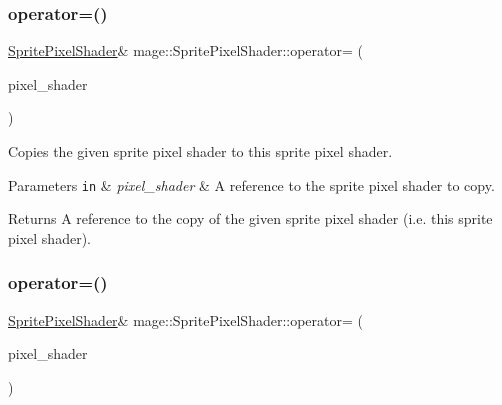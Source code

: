 \subsubsection{\texorpdfstring{operator=()}{operator=()}\hspace{0.1cm}{\footnotesize\ttfamily [1/2]}}
{\footnotesize\ttfamily \hyperlink{classmage_1_1_sprite_pixel_shader}{Sprite\+Pixel\+Shader}\& mage\+::\+Sprite\+Pixel\+Shader\+::operator= (\begin{DoxyParamCaption}\item[{const \hyperlink{classmage_1_1_sprite_pixel_shader}{Sprite\+Pixel\+Shader} \&}]{pixel\+\_\+shader }\end{DoxyParamCaption})\hspace{0.3cm}{\ttfamily [delete]}}

Copies the given sprite pixel shader to this sprite pixel shader.


\begin{DoxyParams}[1]{Parameters}
\mbox{\tt in}  & {\em pixel\+\_\+shader} & A reference to the sprite pixel shader to copy. \\
\hline
\end{DoxyParams}
\begin{DoxyReturn}{Returns}
A reference to the copy of the given sprite pixel shader (i.\+e. this sprite pixel shader). 
\end{DoxyReturn}
\hypertarget{classmage_1_1_sprite_pixel_shader_ad982c266c5ba3510009a3f5e7519e284}{}\label{classmage_1_1_sprite_pixel_shader_ad982c266c5ba3510009a3f5e7519e284} 
\subsubsection{\texorpdfstring{operator=()}{operator=()}\hspace{0.1cm}{\footnotesize\ttfamily [2/2]}}
{\footnotesize\ttfamily \hyperlink{classmage_1_1_sprite_pixel_shader}{Sprite\+Pixel\+Shader}\& mage\+::\+Sprite\+Pixel\+Shader\+::operator= (\begin{DoxyParamCaption}\item[{\hyperlink{classmage_1_1_sprite_pixel_shader}{Sprite\+Pixel\+Shader} \&\&}]{pixel\+\_\+shader }\end{DoxyParamCaption})\hspace{0.3cm}{\ttfamily [delete]}}

